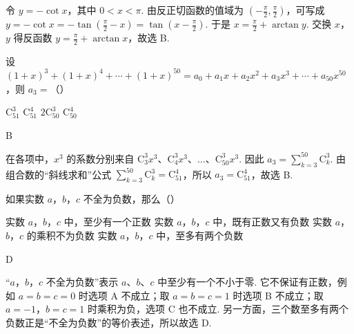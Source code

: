 \documentclass[UTF8,a4paper,oneside,11pt]{ctexbook}
\begin{document}
\begin{solution}
令 \(y=-\cot x\)，其中 \(0<x<\pi\). 由反正切函数的值域为 \(\left(-\frac{\pi}{2},\frac{\pi}{2}\right)\)，可写成
\(y=-\cot x=-\tan\left(\frac{\pi}{2}-x\right)=\tan\left(x-\frac{\pi}{2}\right)\). 于是
\(x=\frac{\pi}{2}+\arctan y\). 交换 \(x\)，\(y\) 得反函数 \(y=\frac{\pi}{2}+\arctan x\)，故选 B.
\end{solution}

\begin{problem}

设 \(\left(1+x\right)^{3}+\left(1+x\right)^{4}+\cdots+\left(1+x\right)^{50}=a_{0}+a_{1}x+a_{2}x^{2}+a_{3}x^{3}+\cdots+a_{50}x^{50}\)，则 \(a_{3}=\)（\quad）

\choices
{\(\mathrm C_{51}^{3}\)}
{\(\mathrm C_{51}^{4}\)}
{\(2\mathrm C_{50}^{3}\)}
{\(\mathrm C_{50}^{4}\)}
\end{problem}

\begin{answer}
B
\end{answer}

\begin{solution}
在各项中，\(x^{3}\) 的系数分别来自
\(\mathrm C_{3}^{3}x^{3}\)、\(\mathrm C_{4}^{3}x^{3}\)、\(\ldots\)、\(\mathrm C_{50}^{3}x^{3}\). 因此 \(a_{3}=\sum_{k=3}^{50}\mathrm C_{k}^{3}\). 由组合数的“斜线求和”公式 \(\sum_{k=3}^{50}\mathrm C_{k}^{3}=\mathrm C_{51}^{4}\)，所以 \(a_{3}=\mathrm C_{51}^{4}\)，故选 B.
\end{solution}

\begin{problem}

如果实数 \(a\)，\(b\)，\(c\) 不全为负数，那么（\quad）

\choices
{实数 \(a\)，\(b\)，\(c\) 中，至少有一个正数}
{实数 \(a\)，\(b\)，\(c\) 中，既有正数又有负数}
{实数 \(a\)，\(b\)，\(c\) 的乘积不为负数}
{实数 \(a\)，\(b\)，\(c\) 中，至多有两个负数}
\end{problem}

\begin{answer}
D
\end{answer}

\begin{solution}
“\(a\)，\(b\)，\(c\) 不全为负数”表示 \(a\)、\(b\)、\(c\) 中至少有一个不小于零. 它不保证有正数，例如 \(a=b=c=0\) 时选项 A 不成立；取 \(a=b=c=1\) 时选项 B 不成立；取 \(a=-1\)，\(b=c=1\) 时乘积为负，选项 C 也不成立. 另一方面，三个数至多有两个负数正是“不全为负数”的等价表述，所以故选 D.
\end{solution}
\end{document}

